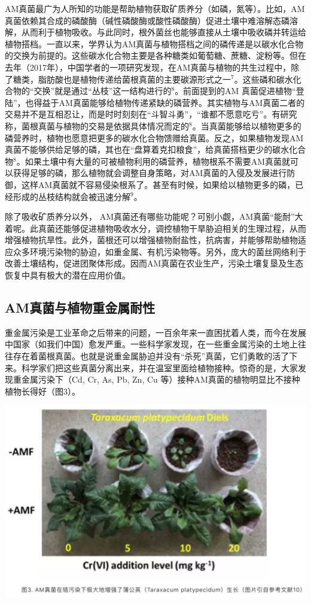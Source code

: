 \documentclass[]{book}
\begin{document}
AM真菌最广为人所知的功能是帮助植物获取矿质养分（如磷，氮等）。比如，AM真菌依赖其合成的磷酸酶（碱性磷酸酶或酸性磷酸酶）促进土壤中难溶解态磷溶解，从而利于植物吸收。与此同时，根外菌丝也能够直接从土壤中吸收磷并转运给植物搭档。一直以来，学界认为AM真菌与植物搭档之间的磷传递是以碳水化合物的交换为前提的。这些碳水化合物主要是各种糖类如葡萄糖、蔗糖、淀粉等。但在去年（2017年），中国学者的一项研究发现，在AM真菌与植物的共生过程中，除了糖类，脂肪酸也是植物传递给菌根真菌的主要碳源形式之一\(^7\)。这些磷和碳水化合物的``交换''就是通过``丛枝''这一结构进行的\(^8\)。前面提到的AM 真菌促进植物``登陆''，也得益于AM真菌能够给植物传递紧缺的磷营养。其实植物与AM真菌二者的交易并不是互相忍让，而是时时刻刻在``斗智斗勇''，``谁都不愿意吃亏''。有研究称，菌根真菌与植物的交易是依据具体情况而定的\(^8\)。当真菌能够给以植物更多的磷营养时，植物也愿意把更多的碳水化合物馈赠给真菌。反之，如果植物发现AM真菌不能够供给足够的磷，其也在``盘算着克扣粮食''，给真菌搭档更少的碳水化合物\(^8\)。如果土壤中有大量的可被植物利用的磷营养，植物根系不需要AM真菌就可以获得足够的磷，那么植物就会调整自身策略，对AM真菌的入侵及发展进行防御，这样AM真菌就不容易侵染根系了。甚至有时候，如果给以植物更多的磷，已经形成的丛枝结构就会被迅速分解\(^9\)。

除了吸收矿质养分以外， AM真菌还有哪些功能呢？可别小觑，AM真菌``能耐''大着呢。此真菌还能够促进植物吸收水分，调控植物干旱胁迫相关的生理过程，从而增强植物抗旱性。此外，菌根还可以增强植物耐盐性，抗病害，并能够帮助植物适应众多环境污染物的胁迫，如重金属、有机污染物等。另外，庞大的菌丝网络利于改善土壤结构，促进团聚体形成。因而AM真菌在农业生产，污染土壤复垦及生态恢复中具有极大的潜在应用价值。

\hypertarget{amux771fux83ccux4e0eux690dux7269ux91cdux91d1ux5c5eux8010ux6027}{%
\subsection{AM真菌与植物重金属耐性}\label{amux771fux83ccux4e0eux690dux7269ux91cdux91d1ux5c5eux8010ux6027}}

重金属污染是工业革命之后带来的问题，一百余年来一直困扰着人类，而今在发展中国家（如我们中国）愈发严重。一些科学家发现，在一些重金属污染的土地上往往存在着菌根真菌。也就是说重金属胁迫并没有``杀死''真菌，它们勇敢的活了下来。科学家们把这些真菌分离出来，并在温室里面给植物接种。惊奇的是，大家发现重金属污染下（Cd, Cr, As, Pb, Zn, Cu 等）接种AM真菌的植物明显比不接种植物长得好（图3）。

\includegraphics[width=6.67in]{images/am3}
\end{document}
